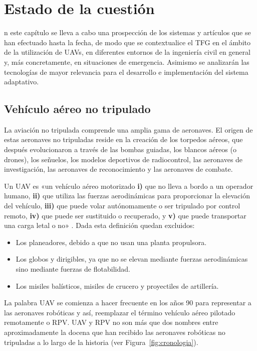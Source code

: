 \chapter{Estado de la cuestión}
\label{chap:antecedentes}

n este capítulo se lleva a cabo una prospección de los sistemas y artículos
que se han efectuado hasta la fecha, de modo que se contextualice el \acs{TFG} en el ámbito 
de la utilización de \acs{UAV}s, en diferentes entornos de la ingeniería civil en general y, más
concretamente, en situaciones de emergencia. Asimismo se analizarán las tecnologías de mayor 
relevancia para el desarrollo e implementación del sistema adaptativo. 

\section{Vehículo aéreo no tripulado}
\label{sec:vehiculonotripulado}

La aviación no tripulada comprende una amplia gama de aeronaves. El origen de estas aeronaves no tripuladas reside 
en la creación de los torpedos aéreos, que después evolucionaron a través de las bombas guiadas, los blancos 
aéreos (o drones), los señuelos, los modelos deportivos de radiocontrol, las aeronaves de investigación, 
las aeronaves de reconocimiento y las aeronaves de combate.

Un \acs{UAV} es «un vehículo aéreo motorizado \textbf{i)} que no lleva a bordo a un operador humano, 
\textbf{ii)} que utiliza las fuerzas aerodinámicas para proporcionar la elevación del vehículo, \textbf{iii)} que puede volar autónomamente 
o ser tripulado por control remoto, \textbf{iv)} que puede ser sustituido o recuperado, y \textbf{v)} que puede transportar una 
carga letal o no» \cite{UAV}. Dada esta definición quedan excluidos:

\begin{itemize}
\item Los planeadores, debido a que no usan una planta propulsora.
\item Los globos y dirigibles, ya que no se elevan mediante fuerzas aerodinámicas sino mediante fuerzas de flotabilidad.
\item Los misiles balísticos, misiles de crucero y proyectiles de artillería.
\end{itemize}

La palabra \acs{UAV} se comienza a hacer frecuente en los años 90 para representar a las aeronaves robóticas 
y así, reemplazar el término vehículo aéreo pilotado remotamente o \acs{RPV}. \acs{UAV} y \acs{RPV} no son más 
que dos nombres entre aproximadamente la docena que han recibido las aeronaves robóticas no tripuladas a lo largo de la historia (ver Figura~\ref{fig:cronologia}).

